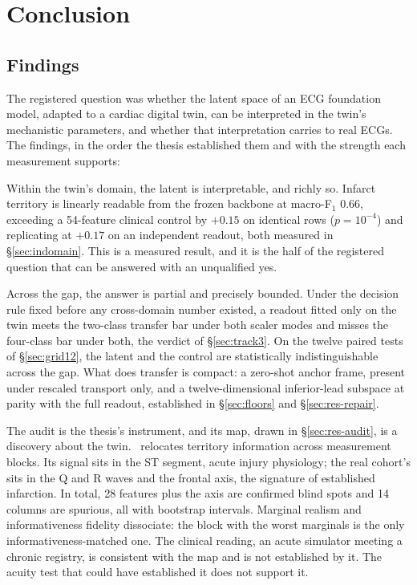 \chapter{Conclusion}
\label{ch:conclusion}

\section{Findings}
\label{sec:conc-findings}

The registered question was whether the latent space of an ECG foundation model, adapted to a cardiac digital twin, can be interpreted in the twin's mechanistic parameters, and whether that interpretation carries to real ECGs. The findings, in the order the thesis established them and with the strength each measurement supports:

Within the twin's domain, the latent is interpretable, and richly so. Infarct territory is linearly readable from the frozen backbone at macro-F$_1$ 0.66, exceeding a 54-feature clinical control by $+0.15$ on identical rows ($p=10^{-4}$) and replicating at $+0.17$ on an independent readout, both measured in \S\ref{sec:indomain}. This is a measured result, and it is the half of the registered question that can be answered with an unqualified yes. 

Across the gap, the answer is partial and precisely bounded. Under the decision rule fixed before any cross-domain number existed, a readout fitted only on the twin meets the two-class transfer bar under both scaler modes and misses the four-class bar under both, the verdict of \S\ref{sec:track3}. On the twelve paired tests of \S\ref{sec:grid12}, the latent and the control are statistically indistinguishable across the gap. What does transfer is compact: a zero-shot anchor frame, present under rescaled transport only, and a twelve-dimensional inferior-lead subspace at parity with the full readout, established in \S\ref{sec:floors} and \S\ref{sec:res-repair}.

The audit is the thesis's instrument, and its map, drawn in \S\ref{sec:res-audit}, is a discovery about the twin. \medalcare\ relocates territory information across measurement blocks. Its signal sits in the ST segment, acute injury physiology; the real cohort's sits in the Q and R waves and the frontal axis, the signature of established infarction. In total, 28 features plus the axis are confirmed blind spots and 14 columns are spurious, all with bootstrap intervals. Marginal realism and informativeness fidelity dissociate: the block with the worst marginals is the only informativeness-matched one. The clinical reading, an acute simulator meeting a chronic registry, is consistent with the map and is not established by it. The acuity test that could have established it does not support it.


